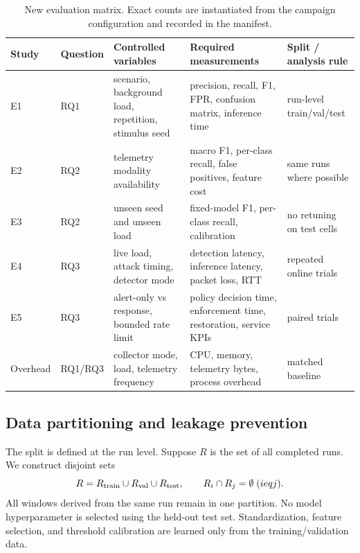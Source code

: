 \documentclass[sigconf,review]{acmart}
\begin{document}
\begin{table}[t]
\caption{New evaluation matrix. Exact counts are instantiated from the campaign configuration and recorded in the manifest.}
\label{tab:experiments}
\centering\scriptsize
\setlength{\tabcolsep}{3.1pt}
\renewcommand{\arraystretch}{1.08}
\begin{tabularx}{\textwidth}{>{\raggedright\arraybackslash}p{} >{\raggedright\arraybackslash}p{} >{\raggedright\arraybackslash}p{} >{\raggedright\arraybackslash}X >{\raggedright\arraybackslash}p{}}
\toprule
Study & Question & Controlled variables & Required measurements & Split / analysis rule \\
\midrule
E1 & RQ1 & scenario, background load, repetition, stimulus seed & precision, recall, F1, FPR, confusion matrix, inference time & run-level train/val/test \\
E2 & RQ2 & telemetry modality availability & macro F1, per-class recall, false positives, feature cost & same runs where possible \\
E3 & RQ2 & unseen seed and unseen load & fixed-model F1, per-class recall, calibration & no retuning on test cells \\
E4 & RQ3 & live load, attack timing, detector mode & detection latency, inference latency, packet loss, RTT & repeated online trials \\
E5 & RQ3 & alert-only vs response, bounded rate limit & policy decision time, enforcement time, restoration, service KPIs & paired trials \\
Overhead & RQ1/RQ3 & collector mode, load, telemetry frequency & CPU, memory, telemetry bytes, process overhead & matched baseline \\
\bottomrule
\end{tabularx}
\end{table}

\subsection{Data partitioning and leakage prevention}
The split is defined at the run level. Suppose $R$ is the set of all completed runs. We construct disjoint sets
\begin{equation}
R=R_{\mathrm{train}}\cup R_{\mathrm{val}}\cup R_{\mathrm{test}},
\qquad
R_i\cap R_j=\emptyset \; (i\\eq j).
\end{equation}
All windows derived from the same run remain in one partition. No model hyperparameter is selected using the held-out test set. Standardization, feature selection, and threshold calibration are learned only from the training/validation data.
\end{document}
